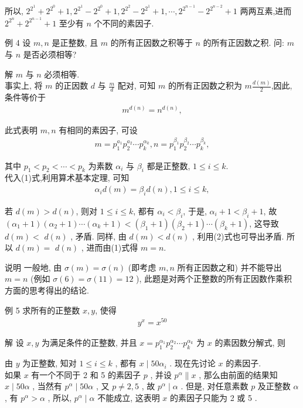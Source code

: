 所以, $2^{2^{1}}+2^{2^{0}}+1,2^{2^{1}}-2^{2^{0}}+1,2^{2^{2}}-2^{2^{1}}+1, \cdots, 2^{2^{n-1}}-2^{2^{n-2}}+1$ 两两互素,进而 $2^{2^{n}}+2^{2^{n-1}}+1$ 至少有 $n$ 个不同的素因子.

例 4 设 $m ,  n$ 是正整数, 且 $m$ 的所有正因数之积等于 $n$ 的所有正因数之积. 问: $m$ 与 $n$ 是否必须相等?

解 $m$ 与 $n$ 必须相等.\\
事实上, 将 $m$ 的正因数 $d$ 与 $\frac{m}{d}$ 配对, 可知 $m$ 的所有正因数之积为 $m \frac{d(m)}{2}$,因此, 条件等价于
\begin{align*}
	m^{d(n)}=n^{d(n)},
\end{align*}

此式表明 $m ,  n$ 有相同的素因子, 可设
\begin{align*}
	m=p_{1}^{a_{1}} p_{2}^{a_{2}} \cdots p_{k}^{\alpha_{k}}, n=p_{1}^{\beta_{1}} p_{2}^{\beta_{2}} \cdots p_{k}^{\beta_{k}},
\end{align*}

其中 $p_{1}<p_{2}<\cdots<p_{k}$ 为素数 $\alpha_{i}$ 与 $\beta_{i}$ 都是正整数, $1 \leqslant i \leqslant k$.\\
代入(1)式,利用算术基本定理, 可知
\begin{align*}
	\alpha_{i} d(m)=\beta_{i} d(n), 1 \leqslant i \leqslant k,
\end{align*}

若 $d(m)>d(n)$, 则对 $1 \leqslant i \leqslant k$, 都有 $\alpha_{i}<\beta_{i}$, 于是, $\alpha_{i}+1<\beta_{i}+1$, 故 $\left(\alpha_{1}+1\right)\left(\alpha_{2}+1\right) \cdots\left(\alpha_{k}+1\right)<\left(\beta_{1}+1\right)\left(\beta_{2}+1\right) \cdots\left(\beta_{k}+1\right)$, 这导致 $d(m)<$ $d(n)$ , 矛盾. 同样, 由 $d(m)<d(n)$ , 利用(2)式也可导出矛盾. 所以 $d(m)=$ $d(n)$ , 进而由(1)式得 $m=n$.

说明 一般地, 由 $\sigma(m)=\sigma(n)$ (即考虑 $m ,  n$ 所有正因数之和) 并不能导出 $m=n$ (例如 $\sigma(6)=\sigma(11)=12$ ), 此题是对两个正整数的所有正因数作乘积方面的思考得出的结论.

例 5 求所有的正整数 $x, y$, 使得
\begin{align*}
	y^{x}=x^{50}
\end{align*}

解 设 $x ,  y$ 为满足条件的正整数, 并且 $x=p_{1}^{\alpha_{1}} p_{2}^{\alpha_{2}} \cdots p_{k}^{\alpha_{k}}$ 为 $x$ 的素因数分解式, 则

由 $y$ 为正整数, 知对 $1 \leqslant i \leqslant k$ , 都有 $x \mid 50 \alpha_{i}$ . 现在先讨论 $x$ 的素因子. \\
如果 $x$ 有一个不同于 2 和 5 的素因子 $p$ , 并设 $p^{\alpha} \| x$ , 那么由前面的结果知 $x \mid 50 \alpha$ , 当然有 $p^{\alpha} \mid 50 \alpha$ , 又 $p \neq 2 ,  5$ , 故 $p^{\alpha} \mid \alpha$ . 但是, 对任意素数 $p$ 及正整数 $\alpha$ , 有 $p^{\alpha}>\alpha$ , 所以,  $p^{\alpha} \mid \alpha$ 不能成立, 这表明 $x$ 的素因子只能为 2 或 5 .


